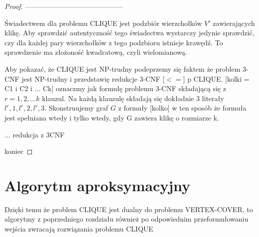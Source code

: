 \begin{proof}
------------------------------------------

Świadectwem dla problemu CLIQUE jest podzbiór wierzchołków $V'$ zawierających klikę. Aby sprawdzić autentyczność tego świadectwa wystarczy jedynie sprawdzić, czy dla każdej pary wierzchołków z tego podzbioru istnieje krawędź. To sprawdzenie ma złożoność kwadratową, czyli wielomianową.

Aby pokazać, że CLIQUE jest NP-trudny podeprzemy się faktem że problem 3-CNF jest NP-trudny i przedstawię redukcje 3-CNF [$<=$] p CLIQUE. [kolki = C1 i C2 i ... Ck] oznaczmy jak formułę problemu 3-CNF składającą się z $r = 1,2,...k$ klauzul. Na każdą klauzulę składają się dokładnie 3 literały $l^r,1, l^r,2, l^r,3$. Skonstruujemy graf $G$ z formuły [kolko] w ten sposób że formuła jest spełniana wtedy i tylko wtedy, gdy G zawiera klikę o rozmiarze k.


... redukcja z 3CNF



koniec
\end{proof}


\section{Algorytm aproksymacyjny}

Dzięki temu że problem CLIQUE jest dualny do problemu VERTEX-COVER, to algorytmy z poprzedniego rozdziału również po odpowiednim przeformułowaniu wejścia zwracają rozwiązania problemu CLIQUE